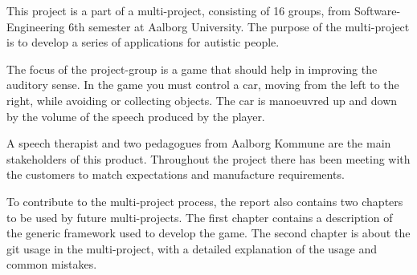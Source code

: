 This project is a part of a multi-project, consisting of 16 groups, from Software-Engineering 6th semester at Aalborg University.
The purpose of the multi-project is to develop a series of applications for autistic people.

The focus of the project-group is a game that should help in improving the auditory sense.
In the game you must control a car, moving from the left to the right, while avoiding or collecting objects.
The car is manoeuvred up and down by the volume of the speech produced by the player.

A speech therapist and two pedagogues from Aalborg Kommune are the main stakeholders of this product.
Throughout the project there has been meeting with the customers to match expectations and manufacture requirements.

To contribute to the multi-project process, the report also contains two chapters to be used by future multi-projects. The first chapter contains a description of the generic framework used to develop the game.
The second chapter is about the git usage in the multi-project, with a detailed explanation of the usage and common mistakes.